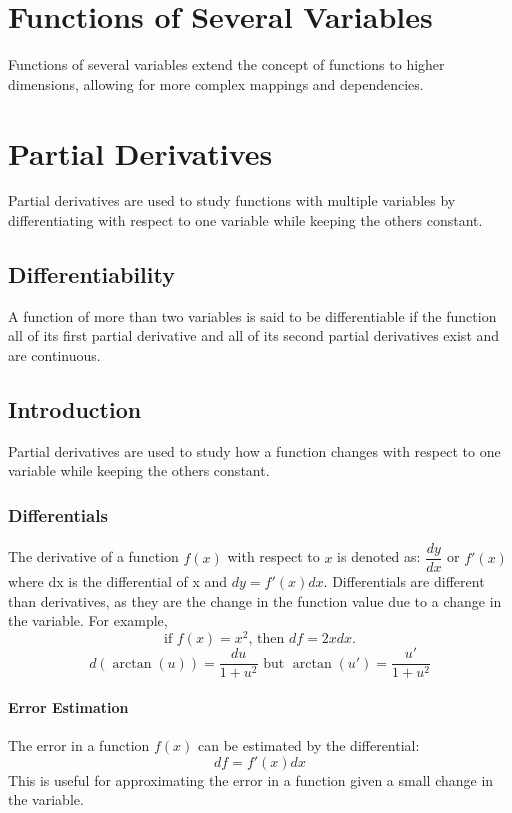 \documentclass[a4paper,12pt,openany]{book}
\begin{document}
\chapter{Functions of Several Variables}
Functions of several variables extend the concept of functions to higher dimensions, allowing for more complex mappings and dependencies.


\chapter{Partial Derivatives}
Partial derivatives are used to study functions with multiple variables by differentiating with respect to one variable while keeping the others constant.

\section{Differentiability}
A function of more than two variables is said to be
differentiable if the function all of its first partial
derivative and all of its second partial derivatives exist
and are continuous.

\section{Introduction}
Partial derivatives are used to study how a function changes with respect to one variable while keeping the others constant.

\subsection{Differentials}
The derivative of a function \(f(x)\) with respect to \(x\) is denoted as: $\dfrac{dy}{dx}$ or $f'(x)$ where dx is the differential of x and $dy = f'(x)dx$.
Differentials are different than derivatives, as they are the change in the function value due to a change in the variable. For example,
\[
\text{if }f(x) = x^2\text{, then } df = 2xdx\text{.}
\]
\[
d(\arctan(u)) = \dfrac{du}{1+u^2}\text{ but }\arctan(u') = \dfrac{u'}{1+u^2}
\]

\subsubsection{Error Estimation}
The error in a function \(f(x)\) can be estimated by the differential:
\[
    df = f'(x)dx
\]
This is useful for approximating the error in a function given a small change in the variable.
\end{document}
